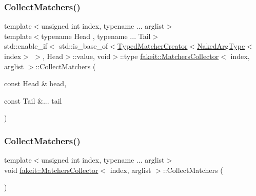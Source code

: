 \subsubsection{\texorpdfstring{CollectMatchers()}{CollectMatchers()}\hspace{0.1cm}{\footnotesize\ttfamily [22/63]}}
{\footnotesize\ttfamily template$<$unsigned int index, typename ... arglist$>$ \\
template$<$typename Head , typename ... Tail$>$ \\
std\+::enable\+\_\+if$<$ std\+::is\+\_\+base\+\_\+of$<$\mbox{\hyperlink{structfakeit_1_1TypedMatcherCreator}{Typed\+Matcher\+Creator}}$<$\mbox{\hyperlink{classfakeit_1_1MatchersCollector_aeda8ced6a2f0cb7c6e4f916f18a91730}{Naked\+Arg\+Type}}$<$index$>$ $>$, Head$>$\+::value, void$>$\+::type \mbox{\hyperlink{classfakeit_1_1MatchersCollector}{fakeit\+::\+Matchers\+Collector}}$<$ index, arglist $>$\+::Collect\+Matchers (\begin{DoxyParamCaption}\item[{const Head \&}]{head,  }\item[{const Tail \&...}]{tail }\end{DoxyParamCaption})\hspace{0.3cm}{\ttfamily [inline]}}

\mbox{\label{classfakeit_1_1MatchersCollector_a2d9a08a347c3915daa33f307a274f13c}} 
\subsubsection{\texorpdfstring{CollectMatchers()}{CollectMatchers()}\hspace{0.1cm}{\footnotesize\ttfamily [23/63]}}
{\footnotesize\ttfamily template$<$unsigned int index, typename ... arglist$>$ \\
void \mbox{\hyperlink{classfakeit_1_1MatchersCollector}{fakeit\+::\+Matchers\+Collector}}$<$ index, arglist $>$\+::Collect\+Matchers (\begin{DoxyParamCaption}{ }\end{DoxyParamCaption})\hspace{0.3cm}{\ttfamily [inline]}}

\mbox{\label{classfakeit_1_1MatchersCollector_a2d9a08a347c3915daa33f307a274f13c}} 
